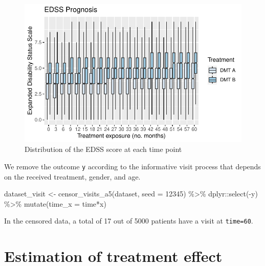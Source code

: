 \documentclass[
  letterpaper,
  DIV=11,
  numbers=noendperiod]{scrreprt}
\newenvironment{Shaded}{\begin{snugshade}}{\end{snugshade}}
\newcommand{\AttributeTok}[1]{\textcolor[rgb]{0.40,0.45,0.13}{#1}}
\newcommand{\DecValTok}[1]{\textcolor[rgb]{0.68,0.00,0.00}{#1}}
\newcommand{\FunctionTok}[1]{\textcolor[rgb]{0.28,0.35,0.67}{#1}}
\newcommand{\NormalTok}[1]{\textcolor[rgb]{0.00,0.23,0.31}{#1}}
\newcommand{\OtherTok}[1]{\textcolor[rgb]{0.00,0.23,0.31}{#1}}
\newcommand{\SpecialCharTok}[1]{\textcolor[rgb]{0.37,0.37,0.37}{#1}}
\begin{document}
\begin{figure}

{\centering \includegraphics{chapter_12_files/figure-pdf/unnamed-chunk-3-1.pdf}

}

\caption{Distribution of the EDSS score at each time point}

\end{figure}

We remove the outcome \texttt{y} according to the informative visit
process that depends on the received treatment, gender, and age.

\begin{Shaded}
\begin{Highlighting}[]
\NormalTok{dataset\_visit }\OtherTok{\textless{}{-}} \FunctionTok{censor\_visits\_a5}\NormalTok{(dataset, }\AttributeTok{seed =} \DecValTok{12345}\NormalTok{) }\SpecialCharTok{\%\textgreater{}\%} 
\NormalTok{  dplyr}\SpecialCharTok{::}\FunctionTok{select}\NormalTok{(}\SpecialCharTok{{-}}\NormalTok{y) }\SpecialCharTok{\%\textgreater{}\%}
  \FunctionTok{mutate}\NormalTok{(}\AttributeTok{time\_x =}\NormalTok{ time}\SpecialCharTok{*}\NormalTok{x)}
\end{Highlighting}
\end{Shaded}

In the censored data, a total of 17 out of 5000 patients have a visit at
\texttt{time=60}.

\hypertarget{estimation-of-treatment-effect}{%
\section{Estimation of treatment
effect}\label{estimation-of-treatment-effect}}
\end{document}

